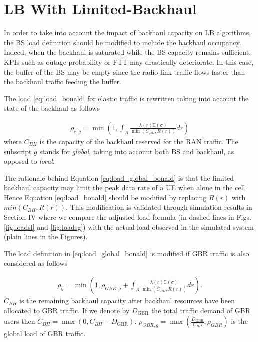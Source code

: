 \documentclass[10pt,draftclsnofoot,onecolumn]{IEEEtran}
\begin{document}
\section{\ac{LB} With Limited-Backhaul} \label{sec:BHcontrainedLB}

    In order to take into account the impact of backhaul capacity
on \ac{LB} algorithms, the \ac{BS} load definition should be
modified to include the backhaul occupancy. Indeed, when the
backhaul is saturated while the \ac{BS} capacity remains
sufficient, \acp{KPI} such as outage probability or \ac{FTT} may
drastically deteriorate. In this case, the buffer of the \ac{BS}
may be empty since the radio link traffic flows faster than the backhaul
traffic feeding the buffer.

    The load \eqref{eq:load_bonald} for elastic traffic is rewritten taking into account the state of the backhaul as follows

    \begin{equation} \label{eq:load_global_bonald}
    \begin{split}
    \rho_{e,g} = \min \left(1, \int_A \frac{\lambda(r) \mathbb{E}(\sigma)}{\min(C_{BH},R(r))} dr \right)
    \end{split}
    \end{equation}
    where $C_{BH}$ is the capacity of the backhaul reserved for the \ac{RAN} traffic. The subscript $g$
stands for \emph{global}, taking into account both \ac{BS} and
backhaul, as opposed to \emph{local}. 

The rationale behind Equation \eqref{eq:load_global_bonald} is
that the limited backhaul capacity may limit the peak data rate of a
\ac{UE} when alone in the cell. Hence Equation
\eqref{eq:load_bonald} should be modified by replacing $R(r)$ with
$min(C_{BH},R(r))$. This modification is validated through
simulation results in Section IV where we compare the adjusted load
formula (in dashed lines in Figs. \ref{fig:loadsl} and
\ref{fig:loadsg}) with the actual load observed in the simulated
system (plain lines in the Figures).

    The load definition in \eqref{eq:load_global_bonald} 
    is modified if \ac{GBR} traffic is also
considered as follows

\begin{equation} \label{eq:load_global_analytic}
    \begin{split}
    \rho_g = \min \left(1, \rho_{GBR,g} + \int_A \frac{\lambda(r) \mathbb{E}(\sigma)}{\min(\bar{C}_{BH},\bar{R}(r))} dr \right).
    \end{split}
\end{equation}
$\bar{C}_{BH}$ is the remaining backhaul capacity after backhaul
resources have been allocated to \ac{GBR} traffic. If we denote by $D_\text{GBR}$ the total traffic demand of \ac{GBR} users then $\bar{C}_{BH} = \max(0,C_{BH} - D_\text{GBR})$. $\rho_{GBR,g} = \max(\frac{D_\text{GBR}}{C_{BH}}, \rho_{GBR})$ is the global load of \ac{GBR} traffic.
\end{document}
